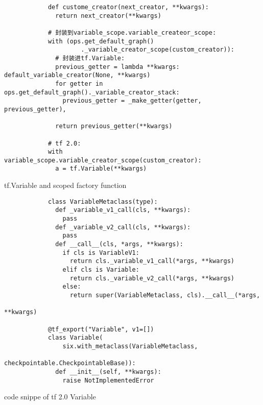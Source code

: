 \begin{frame}[fragile]
    \begin{listing}[H]
        \begin{verbatim}
            def custome_creator(next_creator, **kwargs):
              return next_creator(**kwargs)

            # 封装到variable_scope.variable_createor_scope:
            with (ops.get_default_graph()
                     ._variable_creator_scope(custom_creator)):
              # 封装进tf.Variable:
              previous_getter = lambda **kwargs: default_variable_creator(None, **kwargs)
              for getter in ops.get_default_graph()._variable_creator_stack:
                previous_getter = _make_getter(getter, previous_getter),

              return previous_getter(**kwargs)

            # tf 2.0:
            with variable_scope.variable_creator_scope(custom_creator):
              a = tf.Variable(**kwargs)
        \end{verbatim}
        \caption{tf.Variable and scoped factory function}
    \end{listing}
\end{frame}


\begin{frame}[fragile]
    \begin{listing}[H]
        \begin{verbatim}
            class VariableMetaclass(type):
              def _variable_v1_call(cls, **kwargs):
                pass
              def _variable_v2_call(cls, **kwargs):
                pass
              def __call__(cls, *args, **kwargs):
                if cls is VariableV1:
                  return cls._variable_v1_call(*args, **kwargs)
                elif cls is Variable:
                  return cls._variable_v2_call(*args, **kwargs)
                else:
                  return super(VariableMetaclass, cls).__call__(*args,
                                                                **kwargs)

            @tf_export("Variable", v1=[])
            class Variable(
                six.with_metaclass(VariableMetaclass,
                                   checkpointable.CheckpointableBase)):
              def __init__(self, **kwargs):
                raise NotImplementedError
        \end{verbatim}
        \caption{code snippe of tf 2.0 Variable}
    \end{listing}
\end{frame}
